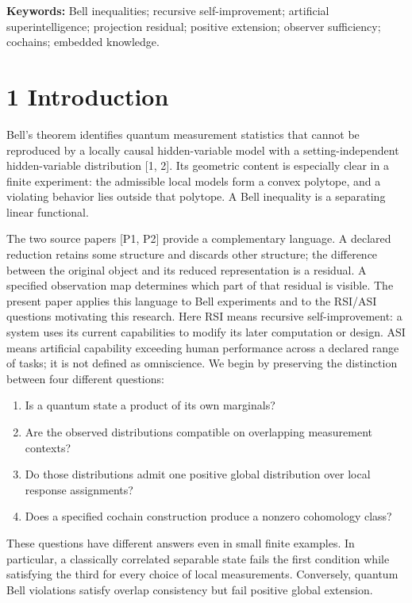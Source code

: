\documentclass[
]{article}
\providecommand{\tightlist}{%
  \setlength{\itemsep}{0pt}\setlength{\parskip}{0pt}}
\providecommand{\tightlist}{%
  \setlength{\itemsep}{0pt}\setlength{\parskip}{0pt}}
\begin{document}
\textbf{Keywords:} Bell inequalities; recursive self-improvement; artificial superintelligence; projection residual; positive extension; observer sufficiency; cochains; embedded knowledge.

\section{1 Introduction}\label{introduction}

Bell's theorem identifies quantum measurement statistics that cannot be reproduced by a locally causal hidden-variable model with a setting-independent hidden-variable distribution {[}1, 2{]}. Its geometric content is especially clear in a finite experiment: the admissible local models form a convex polytope, and a violating behavior lies outside that polytope. A Bell inequality is a separating linear functional.

The two source papers {[}P1, P2{]} provide a complementary language. A declared reduction retains some structure and discards other structure; the difference between the original object and its reduced representation is a residual. A specified observation map determines which part of that residual is visible. The present paper applies this language to Bell experiments and to the RSI/ASI questions motivating this research. Here RSI means recursive self-improvement: a system uses its current capabilities to modify its later computation or design. ASI means artificial capability exceeding human performance across a declared range of tasks; it is not defined as omniscience. We begin by preserving the distinction between four different questions:

\begin{enumerate}
\def\labelenumi{\arabic{enumi}.}
\tightlist
\item
  Is a quantum state a product of its own marginals?
\item
  Are the observed distributions compatible on overlapping measurement contexts?
\item
  Do those distributions admit one positive global distribution over local response assignments?
\item
  Does a specified cochain construction produce a nonzero cohomology class?
\end{enumerate}

These questions have different answers even in small finite examples. In particular, a classically correlated separable state fails the first condition while satisfying the third for every choice of local measurements. Conversely, quantum Bell violations satisfy overlap consistency but fail positive global extension.
\end{document}
